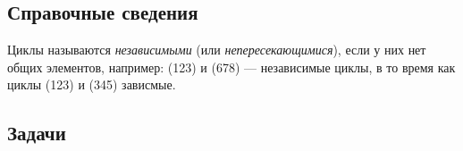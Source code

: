 \subsection*{Справочные сведения}

Циклы называются \textit{независимыми} (или \textit{непересекающимися}), если у них нет общих элементов, например: (123) и (678) --- независимые циклы, в то время как циклы (123) и (345) зависмые.



\subsection*{Задачи}


